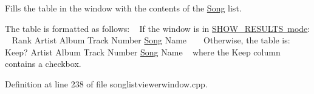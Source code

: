 Fills the table in the window with the contents of the \mbox{\hyperlink{class_song}{Song}} list. 

The table is formatted as follows\+: ~\newline
 If the window is in \mbox{\hyperlink{class_song_list_viewer_window_a6f23a68c416173f6b571a2cc4990a927}{S\+H\+O\+W\+\_\+\+R\+E\+S\+U\+L\+TS mode}}\+: ~\newline
 Rank Artist Album Track Number \mbox{\hyperlink{class_song}{Song}} Name ~\newline
 ~\newline
 Otherwise, the table is\+: ~\newline
 Keep? Artist Album Track Number \mbox{\hyperlink{class_song}{Song}} Name ~\newline
 where the Keep column contains a checkbox. 

Definition at line 238 of file songlistviewerwindow.\+cpp.


